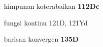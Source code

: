 himpunan koterabaikan {\bf 112Dc}



































fungsi kontinu 121D, 121Yd

















































{barisan konvergen }
{\bf 135D}







































